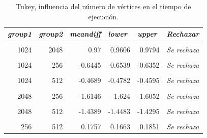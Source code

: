 \documentclass{article}
\begin{document}
\begin{table}[htbp]
  \centering
  \caption{Tukey, influencia del número de vértices en el tiempo de ejecución.}
    \begin{tabular}{rrrrrl}
    \toprule
    \multicolumn{1}{l}{\textit{\textbf{group1}}} & \multicolumn{1}{l}{\textit{\textbf{group2}}} & \multicolumn{1}{l}{\textit{\textbf{meandiff}}} & \multicolumn{1}{l}{\textit{\textbf{lower}}} & \multicolumn{1}{l}{\textit{\textbf{upper}}} & \textit{\textbf{Rechazar}} \\
    \midrule
          &       &       &       &       &  \\
    1024  & 2048  & 0.97  & 0.9606 & 0.9794 & \textit{Se rechaza} \\
          &       &       &       &       &  \\
    1024  & 256   & -0.6445 & -0.6539 & -0.6352 & \textit{Se rechaza} \\
          &       &       &       &       &  \\
    1024  & 512   & -0.4689 & -0.4782 & -0.4595 & \textit{Se rechaza} \\
          &       &       &       &       &  \\
    2048  & 256   & -1.6146 & -1.624 & -1.6052 & \textit{Se rechaza} \\
          &       &       &       &       &  \\
    2048  & 512   & -1.4389 & -1.4483 & -1.4295 & \textit{Se rechaza} \\
          &       &       &       &       &  \\
    256   & 512   & 0.1757 & 0.1663 & 0.1851 & \textit{Se rechaza} \\
    \bottomrule
    \end{tabular}%
  \label{tab:t5}%
\end{table}%
\end{document}
